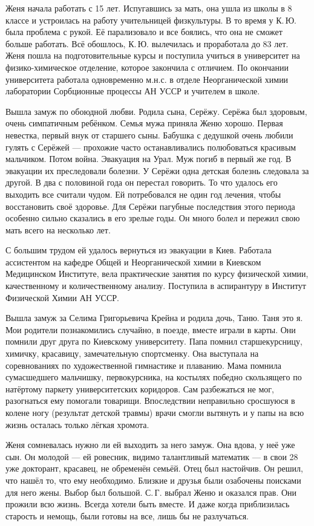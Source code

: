 Женя начала работать с 15 лет. Испугавшись за мать, она ушла из школы в 8 классе и устроилась на работу учительницей физкультуры. В то время у К.\,Ю. была проблема с рукой. Её парализовало и все боялись, что она не сможет больше работать. Всё обошлось, К.\,Ю. вылечилась и проработала до 83 лет. Женя пошла на подготовительные курсы и поступила учиться в университет на физико-химическое отделение, которое закончила с отличием. По окончании университета работала одновременно м.н.с. в отделе Неорганической химии лаборатории Сорбционные процессы АН \linebreak УССР и учителем в школе.

Вышла замуж по обоюдной любви. Родила сына, Серёжу. Серёжа был здоровым, очень симпатичным ребёнком. Семья мужа приняла Женю хорошо. Первая невестка, первый внук от старшего сыны. Бабушка с дедушкой очень любили гулять с Серёжей --- прохожие часто останавливались полюбоваться красивым мальчиком. Потом война. Эвакуация на Урал. Муж погиб в первый же год. В эвакуации их преследовали болезни. У Серёжи одна детская болезнь следовала за другой. В два с половиной года он перестал говорить. То что удалось его выходить все считали чудом. Ей потребовался не один год лечения, чтобы восстановить своё здоровье. Для Серёжи пагубные последствия этого периода особенно сильно сказались в его зрелые годы. Он много болел и пережил свою мать всего на несколько лет.

С большим трудом ей удалось вернуться из эвакуации в Киев. Работала ассистентом на кафедре Общей и Неорганической химии в Киевском Медицинском Институте, вела практические занятия по курсу физической химии, качественному и количественному анализу. Поступила в аспирантуру в Институт Физической Химии АН УССР.

Вышла замуж за Селима Григорьевича Крейна и родила дочь, Таню. Таня это я. Мои родители познакомились случайно, в поезде, вместе играли в карты. Они помнили друг друга по Киевскому университету. Папа помнил старшекурсницу, химичку, красавицу, замечательную спортсменку. Она выступала на соревнованиях по художественной гимнастике и плаванию. Мама помнила сумасшедшего мальчишку, первокурсника, на костылях победно скользящего по натёртому паркету университетских коридоров. Сам разбежаться не мог, разогнаться ему помогали товарищи. Впоследствии неправильно сросшуюся в колене ногу (результат детской травмы) врачи смогли вытянуть и у папы на всю жизнь осталась только лёгкая хромота.

Женя сомневалась нужно ли ей выходить за него замуж. Она вдова, у неё уже сын. Он молодой --- ей ровесник, видимо талантливый математик --- в свои 28 уже докторант, красавец, не обременён семьёй. Отец был настойчив. Он решил, что нашёл то, что ему необходимо. Близкие и друзья были озабочены поисками для него жены. Выбор был большой. С.\,Г. выбрал Женю и оказался прав. Они прожили всю жизнь. Всегда хотели быть вместе. И даже когда приблизилась старость и немощь, были готовы на все, лишь бы не разлучаться.

